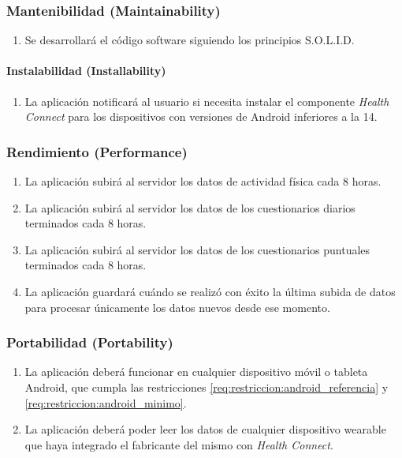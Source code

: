         \subsubsection{Mantenibilidad (Maintainability)}
            \begin{enumerate}[resume, label=\textbf{\texttt{RNF-\arabic*}}]
                \item Se desarrollará el código software siguiendo los principios S.O.L.I.D.
            \end{enumerate}
            \paragraph{Instalabilidad (Installability)}
                \begin{enumerate}[resume, label=\textbf{\texttt{RNF-\arabic*}}]
                    \item La aplicación notificará al usuario si necesita instalar el componente \textit{Health Connect} para los dispositivos con versiones de Android inferiores a la 14.
                \end{enumerate}
        \subsubsection{Rendimiento (Performance)}
            \begin{enumerate}[resume, label=\textbf{\texttt{RNF-\arabic*}}]
                \item La aplicación subirá al servidor los datos de actividad física cada 8 horas.
                \item La aplicación subirá al servidor los datos de los cuestionarios diarios terminados cada 8 horas.
                \item La aplicación subirá al servidor los datos de los cuestionarios puntuales terminados cada 8 horas.
                \item La aplicación guardará cuándo se realizó con éxito la última subida de datos para procesar únicamente los datos nuevos desde ese momento.
            \end{enumerate}
        \subsubsection{Portabilidad (Portability)}
            \begin{enumerate}[resume, label=\textbf{\texttt{RNF-\arabic*}}]
                \item La aplicación deberá funcionar en cualquier dispositivo móvil o tableta Android, que cumpla las restricciones \ref{req:restriccion:android_referencia} y \ref{req:restriccion:android_minimo}.
                \item La aplicación deberá poder leer los datos de cualquier dispositivo \gls{wearable} que haya integrado el fabricante del mismo con \textit{Health Connect}.
            \end{enumerate}
